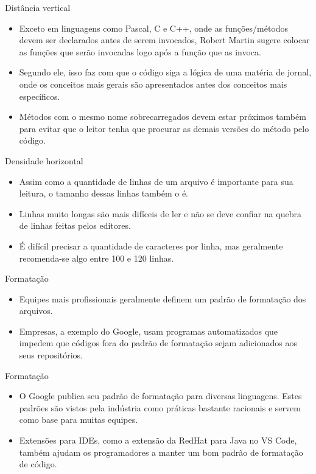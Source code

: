 \documentclass[11pt]{beamer}
\begin{document}
  \begin{frame}{Distância vertical}
    \begin{itemize}
      \item Exceto em linguagens como Pascal, C e C++, onde as funções/métodos devem ser declarados antes de serem invocados, Robert Martin sugere colocar as funções que serão invocadas logo após a função que as invoca.
      \item Segundo ele, isso faz com que o código siga a lógica de uma matéria de jornal, onde os conceitos mais gerais são apresentados antes dos conceitos mais específicos.
      \item Métodos com o mesmo nome sobrecarregados devem estar próximos também para evitar que o leitor tenha que procurar as demais versões do método pelo código.
    \end{itemize}
  \end{frame}

  \begin{frame}{Densidade horizontal}
    \begin{itemize}
      \item Assim como a quantidade de linhas de um arquivo é importante para sua leitura, o tamanho dessas linhas também o é.
      \item Linhas muito longas são mais difíceis de ler e não se deve confiar na quebra de linhas feitas pelos editores.
      \item É difícil precisar a quantidade de caracteres por linha, mas geralmente recomenda-se algo entre 100 e 120 linhas.
    \end{itemize}
  \end{frame}

  \begin{frame}{Formatação}
    \begin{itemize}
      \item Equipes mais profissionais geralmente definem um padrão de formatação dos arquivos.
      \item Empresas, a exemplo do Google, usam programas automatizados que impedem que códigos fora do padrão de formatação sejam adicionados aos seus repositórios. 
    \end{itemize}
  \end{frame}

  \begin{frame}{Formatação}
    \begin{itemize}
      \item O Google publica seu padrão de formatação para diversas linguagens. Estes padrões são vistos pela indústria como práticas bastante racionais e servem como base para muitas equipes.
      \item Extensões para IDEs, como a extensão da RedHat para Java no VS Code, também ajudam os programadores a manter um bom padrão de formatação de código.
    \end{itemize}
  \end{frame}
\end{document}
